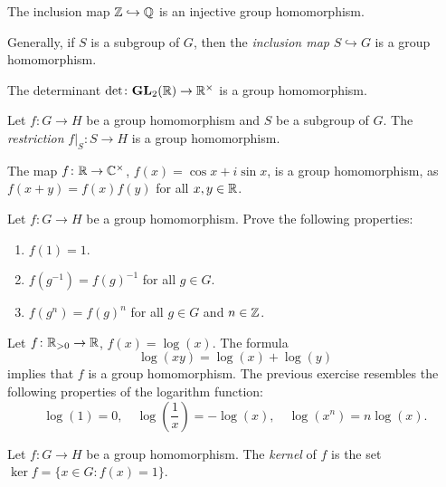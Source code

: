 \begin{example}
The inclusion map $\mathbb{Z}\hookrightarrow\mathbb{Q}$ is an injective group homomorphism. 
\end{example}

Generally, if $S$ is a subgroup of $G$, 
then the \emph{inclusion map}  $S\hookrightarrow G$ is a group
homomorphism. 

\begin{example}
The determinant $\det\colon\mathbf{GL}_2(\mathbb{R})\to\mathbb{R}^\times$ is a group homomorphism. 
\end{example}

\begin{example}
    Let $f\colon G\to H$ be a group homomorphism and
    $S$ be a subgroup of $G$.
    The \emph{restriction} $f|_S\colon S\to H$ is a group homomorphism. 
\end{example}

\begin{example}
The map $f\colon\mathbb{R}\to\mathbb{C}^\times$, $f(x)=\cos x+i\sin x$, is a group
homomorphism, as 
$f(x+y)=f(x)f(y)$ for all $x,y\in\mathbb{R}$.
\end{example}

\begin{exercise}
Let $f\colon G\to H$ be a group homomorphism. Prove the following properties: 
\begin{enumerate}
    \item $f(1)=1$.
    \item $f(g^{-1})=f(g)^{-1}$ for all $g\in G$.
    \item $f(g^n)=f(g)^n$ for all $g\in G$ and $n\in\mathbb{Z}$.
\end{enumerate}
\end{exercise}

\begin{example}
Let $f\colon\mathbb{R}_{>0}\to\mathbb{R}$, $f(x)=\log(x)$. The formula 
\[\log(xy)=\log(x)+
\log(y)
\]
implies that $f$ is a group homomorphism. 
The previous exercise resembles 
the following properties of the logarithm function: 
\[
\log(1)=0,
\quad
\log\left(\frac{1}{x}\right)=-\log(x),
\quad
\log(x^n)=n\log(x).
\]
\end{example}

\begin{definition}
        Let $f\colon G\to H$ be a group homomorphism. The \emph{kernel} of $f$
        is the set 
        $\ker f=\{x\in G:f(x)=1\}$.
\end{definition}

